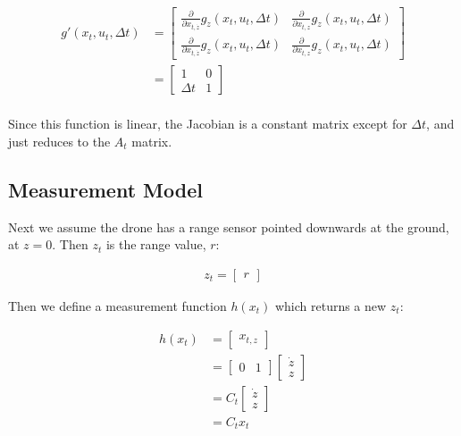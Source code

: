 \documentclass{article}
\begin{document}
\begin{align}
  g'(x_t, u_t, \Delta t) &= \left[\begin{array}{cccc}
      \frac{\partial}{\partial x_{t,\dot{z}}} g_{\dot{z}}(x_t, u_t, \Delta t) &
      \frac{\partial}{\partial x_{t,z}} g_{\dot{z}}(x_t, u_t, \Delta t)\\
%
      \frac{\partial}{\partial x_{t,\dot{z}}} g_z(x_t, u_t, \Delta t) &
      \frac{\partial}{\partial x_{t,z}} g_z(x_t, u_t, \Delta t)
    \end{array}\right]\\
  &=
  \left[\begin{array}{cccc}
      1&
      0\\
%
      \Delta t&
      1
    \end{array}\right]\\
\end{align}

Since this function is linear, the Jacobian is a constant matrix
except for $\Delta t$, and just reduces to the $A_t$ matrix.  

\subsection{Measurement Model}

Next we assume the drone has a range sensor pointed downwards at the
ground, at $z=0$.  Then $z_t$ is the range value, $r$:

\begin{align}
  z_t = \left[\begin{array}{c} r \end{array}\right]
\end{align}

Then we define a measurement function $h(x_t)$ which returns a new $z_t$:

\begin{align}
  h(x_t) &= \left[\begin{array}{c} x_{t,z} \end{array}   \right]\\
  &= \left[\begin{array}{cc} 0&1 \end{array}   \right] \left[\begin{array}{c}\dot{z}\\z\end{array}\right]\\
   &= C_t \left[\begin{array}{c}\dot{z}\\ z \end{array}\right]\\
   &= C_t x_t
\end{align}
\end{document}
